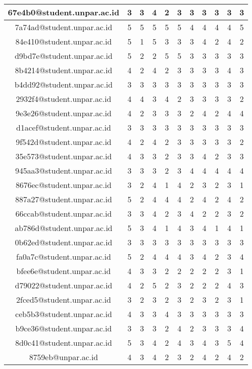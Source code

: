 \begin{longtable}{|c|c|c|c|c|c|c|c|c|c|c|}
\hline	67e4b0@student.unpar.ac.id	&	3	&	3	&	4	&	2	&	3	&	3	&	3	&	3	&	3	&	3	\\
\hline	7a74ad@student.unpar.ac.id	&	5	&	5	&	5	&	5	&	5	&	4	&	4	&	4	&	4	&	5	\\
\hline	84e410@student.unpar.ac.id	&	5	&	1	&	5	&	3	&	3	&	3	&	4	&	2	&	4	&	2	\\
\hline	d9bd7e@student.unpar.ac.id	&	5	&	2	&	2	&	5	&	5	&	3	&	3	&	3	&	3	&	3	\\
\hline	8b4214@student.unpar.ac.id	&	4	&	2	&	4	&	2	&	3	&	3	&	3	&	3	&	4	&	3	\\
\hline	b4dd92@student.unpar.ac.id	&	3	&	3	&	3	&	3	&	3	&	3	&	3	&	3	&	3	&	3	\\
\hline	2932f4@student.unpar.ac.id	&	4	&	4	&	3	&	4	&	2	&	3	&	3	&	3	&	3	&	2	\\
\hline	9e3e26@student.unpar.ac.id	&	4	&	2	&	3	&	3	&	3	&	2	&	4	&	2	&	4	&	4	\\
\hline	d1acef@student.unpar.ac.id	&	3	&	3	&	3	&	3	&	3	&	3	&	3	&	3	&	3	&	3	\\
\hline	9f542d@student.unpar.ac.id	&	4	&	2	&	4	&	2	&	3	&	3	&	3	&	3	&	3	&	2	\\
\hline	35e573@student.unpar.ac.id	&	4	&	3	&	3	&	2	&	3	&	3	&	4	&	2	&	3	&	3	\\
\hline	945aa3@student.unpar.ac.id	&	3	&	3	&	3	&	2	&	3	&	4	&	4	&	4	&	4	&	4	\\
\hline	8676ec@student.unpar.ac.id	&	3	&	2	&	4	&	1	&	4	&	2	&	3	&	2	&	3	&	1	\\
\hline	887a27@student.unpar.ac.id	&	5	&	2	&	4	&	4	&	4	&	2	&	4	&	2	&	4	&	2	\\
\hline	66ccab@student.unpar.ac.id	&	3	&	3	&	4	&	2	&	3	&	4	&	2	&	2	&	3	&	2	\\
\hline	ab786d@student.unpar.ac.id	&	5	&	3	&	4	&	1	&	4	&	3	&	4	&	1	&	4	&	1	\\
\hline	0b62ed@student.unpar.ac.id	&	3	&	3	&	3	&	3	&	3	&	3	&	3	&	3	&	3	&	3	\\
\hline	fa0a7c@student.unpar.ac.id	&	5	&	2	&	4	&	4	&	4	&	3	&	4	&	2	&	3	&	4	\\
\hline	bfee6e@student.unpar.ac.id	&	4	&	3	&	3	&	2	&	2	&	2	&	2	&	2	&	3	&	1	\\
\hline	d79022@student.unpar.ac.id	&	4	&	2	&	5	&	2	&	3	&	2	&	2	&	2	&	4	&	3	\\
\hline	2fced5@student.unpar.ac.id	&	3	&	2	&	3	&	2	&	3	&	2	&	3	&	2	&	3	&	1	\\
\hline	ceb5b3@student.unpar.ac.id	&	4	&	3	&	3	&	4	&	3	&	3	&	3	&	3	&	3	&	3	\\
\hline	b9ce36@student.unpar.ac.id	&	3	&	3	&	3	&	2	&	4	&	2	&	3	&	3	&	3	&	4	\\
\hline	8d0c41@student.unpar.ac.id	&	5	&	3	&	4	&	2	&	4	&	3	&	4	&	3	&	5	&	4	\\
\hline	8759eb@unpar.ac.id	&	4	&	3	&	4	&	2	&	3	&	2	&	4	&	2	&	4	&	2	\\
\hline
\end{longtable}
